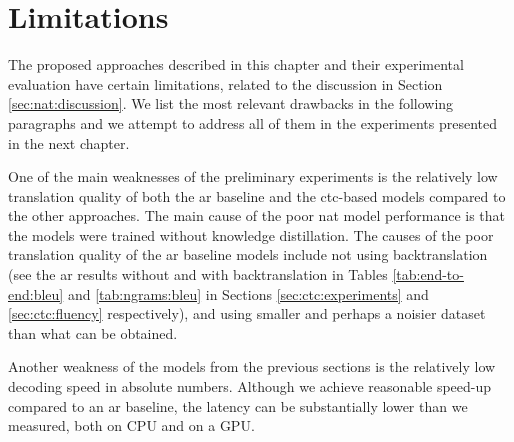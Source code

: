 \section{Limitations}
\label{sec:ctc:limitations}

The proposed approaches described in this chapter and their experimental
evaluation have certain limitations, related to the discussion in Section
\ref{sec:nat:discussion}. We list the most relevant drawbacks in the following
paragraphs and we attempt to address all of them in the experiments presented
in the next chapter.

One of the main weaknesses of the preliminary experiments is the relatively low
translation quality of both the \acl{ar} baseline and the \acs{ctc}-based
models compared to the other approaches. The main cause of the poor \ac{nat}
model performance is that the models were trained without knowledge
distillation. The causes of the poor translation quality of the \ac{ar}
baseline models include not using backtranslation (see the \ac{ar} results
without and with backtranslation in Tables \ref{tab:end-to-end:bleu} and
\ref{tab:ngrams:bleu} in Sections \ref{sec:ctc:experiments} and
\ref{sec:ctc:fluency} respectively), and using smaller and perhaps a noisier
dataset than what can be obtained.

Another weakness of the models from the previous sections is the relatively low
decoding speed in absolute numbers. Although we achieve reasonable speed-up
compared to an \ac{ar} baseline, the latency can be substantially lower than we
measured, both on CPU and on a GPU.



